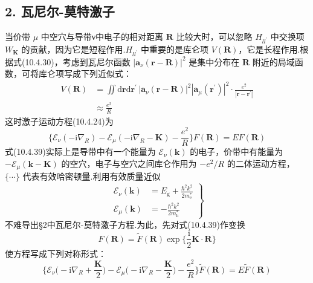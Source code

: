 \subsection*{2. 瓦尼尔-莫特激子}

当价带 $\mu$ 中空穴与导带ν中电子的相对距离 $\boldsymbol{R}$ 比较大时，可以忽略 $H_{ll^{\prime}}$ 中交换项 $W_{\boldsymbol{K}}$ 的贡献，因为它是短程作用.$H_{ll^{\prime}}$ 中重要的是库仑项 $V(\boldsymbol{R})$，它是长程作用.根据式(10.4.30)，考虑到瓦尼尔函数 $|\boldsymbol{a}_{\nu}(\boldsymbol{r}-\boldsymbol{R})|^{2}$ 是集中分布在 $\boldsymbol{R}$ 附近的局域函数，可将库仑项写成下列近似式：
\begin{equation}
\begin{aligned}
  V(\boldsymbol{R})&=\iint\mathrm{d}\boldsymbol{r}\mathrm{d}\boldsymbol{r}^{\prime}\,
  |\boldsymbol{a}_{\nu}(\boldsymbol{r}-\boldsymbol{R})|^{2}
  |\boldsymbol{a}_{\mu}(\boldsymbol{r}^{\prime})|^{2}
  \cdot\frac{e^{2}}{|\boldsymbol{r}-\boldsymbol{r}^{\prime}|}\\
  &\approx\frac{e^{2}}{R}
\end{aligned}
\end{equation}
这时激子运动方程(10.4.24)为
\begin{equation}
  \biggl\{\mathscr{E}_{\nu}(-\mathrm{i}\nabla_{R})
  -\mathscr{E}_{\mu}(-\mathrm{i}\nabla_{R}-\boldsymbol{K})
  -\frac{e^{2}}{R}\biggr\}F(\boldsymbol{R})=EF(\boldsymbol{R})
\end{equation}
式(10.4.39)实际上是导带中有一个能量为 $\mathscr{E}_{\nu}(\boldsymbol{k})$ 的电子，价带中有能量为 $-\mathscr{E}_{\mu}(\boldsymbol{k}-\boldsymbol{K})$ 的空穴，电子与空穴之间库仑作用为 $-e^{2}/R$ 的二体运动方程，$\{\cdots\}$ 代表有效哈密顿量.利用有效质量近似
\begin{equation}
\left.
\begin{aligned}
  \mathscr{E}_{\nu}(\boldsymbol{k})&=E_{\mathrm{g}}+\frac{\hbar^{2}k^{2}}{2m_{\mathrm{e}}^{*}}\\
  \mathscr{E}_{\mu}(\boldsymbol{k})&=-\frac{\hbar^{2}k^{2}}{2m_{\mathrm{h}}^{*}}
\end{aligned}\right\}
\end{equation}
不难导出§2中瓦尼尔-莫特激子方程.为此，先对式(10.4.39)作变换
\begin{equation}
  F(\boldsymbol{R})=\widetilde{F}(\boldsymbol{R})
  \exp\biggl\{\frac{\mathrm{i}}{2}\boldsymbol{K}\cdot\boldsymbol{R}\biggr\}
\end{equation}
使方程写成下列对称形式：
\begin{equation}
  \biggl\{\mathscr{E}_{\nu}\biggl(-\mathrm{i}\nabla_{R}
  +\frac{\boldsymbol{K}}{2}\biggr)
  -\mathscr{E}_{\mu}\biggl(-\mathrm{i}\nabla_{R}
  -\frac{\boldsymbol{K}}{2}\biggr)
  -\frac{e^{2}}{R}\biggr\}\widetilde{F}(\boldsymbol{R})=E\widetilde{F}(\boldsymbol{R})
\end{equation}
